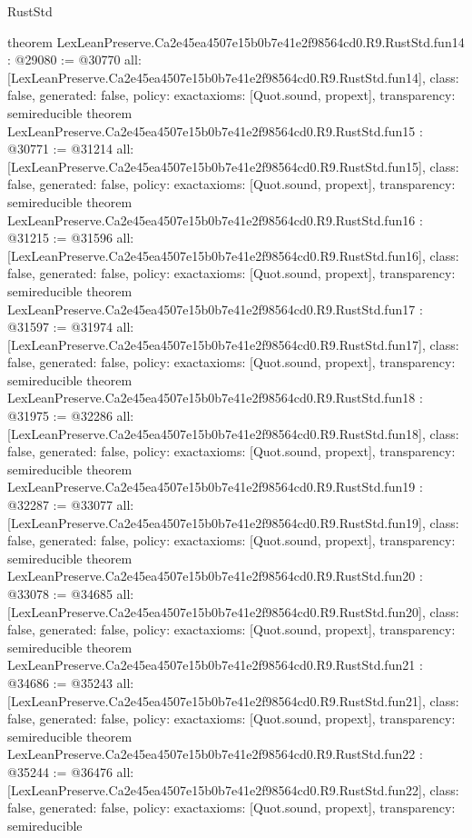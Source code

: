 \begin{lexlean}{RustStd}
\begin{coremodule}
{}
theorem LexLeanPreserve.Ca2e45ea4507e15b0b7e41e2f98564cd0.R9.RustStd.fun14 : @29080 := @30770 {
  all: [LexLeanPreserve.Ca2e45ea4507e15b0b7e41e2f98564cd0.R9.RustStd.fun14],
  class: false,
  generated: false,
  policy: exact{axioms: [Quot.sound, propext]},
  transparency: semireducible
}
theorem LexLeanPreserve.Ca2e45ea4507e15b0b7e41e2f98564cd0.R9.RustStd.fun15 : @30771 := @31214 {
  all: [LexLeanPreserve.Ca2e45ea4507e15b0b7e41e2f98564cd0.R9.RustStd.fun15],
  class: false,
  generated: false,
  policy: exact{axioms: [Quot.sound, propext]},
  transparency: semireducible
}
theorem LexLeanPreserve.Ca2e45ea4507e15b0b7e41e2f98564cd0.R9.RustStd.fun16 : @31215 := @31596 {
  all: [LexLeanPreserve.Ca2e45ea4507e15b0b7e41e2f98564cd0.R9.RustStd.fun16],
  class: false,
  generated: false,
  policy: exact{axioms: [Quot.sound, propext]},
  transparency: semireducible
}
theorem LexLeanPreserve.Ca2e45ea4507e15b0b7e41e2f98564cd0.R9.RustStd.fun17 : @31597 := @31974 {
  all: [LexLeanPreserve.Ca2e45ea4507e15b0b7e41e2f98564cd0.R9.RustStd.fun17],
  class: false,
  generated: false,
  policy: exact{axioms: [Quot.sound, propext]},
  transparency: semireducible
}
theorem LexLeanPreserve.Ca2e45ea4507e15b0b7e41e2f98564cd0.R9.RustStd.fun18 : @31975 := @32286 {
  all: [LexLeanPreserve.Ca2e45ea4507e15b0b7e41e2f98564cd0.R9.RustStd.fun18],
  class: false,
  generated: false,
  policy: exact{axioms: [Quot.sound, propext]},
  transparency: semireducible
}
theorem LexLeanPreserve.Ca2e45ea4507e15b0b7e41e2f98564cd0.R9.RustStd.fun19 : @32287 := @33077 {
  all: [LexLeanPreserve.Ca2e45ea4507e15b0b7e41e2f98564cd0.R9.RustStd.fun19],
  class: false,
  generated: false,
  policy: exact{axioms: [Quot.sound, propext]},
  transparency: semireducible
}
theorem LexLeanPreserve.Ca2e45ea4507e15b0b7e41e2f98564cd0.R9.RustStd.fun20 : @33078 := @34685 {
  all: [LexLeanPreserve.Ca2e45ea4507e15b0b7e41e2f98564cd0.R9.RustStd.fun20],
  class: false,
  generated: false,
  policy: exact{axioms: [Quot.sound, propext]},
  transparency: semireducible
}
theorem LexLeanPreserve.Ca2e45ea4507e15b0b7e41e2f98564cd0.R9.RustStd.fun21 : @34686 := @35243 {
  all: [LexLeanPreserve.Ca2e45ea4507e15b0b7e41e2f98564cd0.R9.RustStd.fun21],
  class: false,
  generated: false,
  policy: exact{axioms: [Quot.sound, propext]},
  transparency: semireducible
}
theorem LexLeanPreserve.Ca2e45ea4507e15b0b7e41e2f98564cd0.R9.RustStd.fun22 : @35244 := @36476 {
  all: [LexLeanPreserve.Ca2e45ea4507e15b0b7e41e2f98564cd0.R9.RustStd.fun22],
  class: false,
  generated: false,
  policy: exact{axioms: [Quot.sound, propext]},
  transparency: semireducible
}
\end{coremodule}
\end{lexlean}
